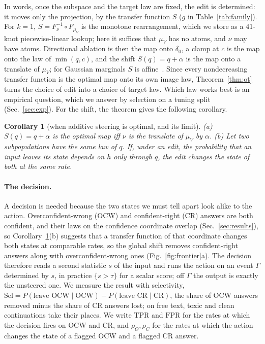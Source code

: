 \documentclass{article}
\newtheorem{corollary}{Corollary}
\newcommand{\ocw}{OCW}
\newcommand{\crok}{CR}
\begin{document}
In words, once the subspace and the target law are fixed, the edit is
determined: it moves only the projection, by the transfer function $S$ ($g$ in
Table~\ref{tab:family}). For $k=1$, $S=F_\nu^{-1}\circ F_{\mu_V}$ is the
monotone rearrangement, which we store as a 41-knot piecewise-linear lookup;
here it suffices that $\mu_V$ has no atoms, and $\nu$ may have atoms.
Directional ablation is then the map onto $\delta_0$, a clamp at $c$ is the map
onto the law of $\min(q,c)$, and the shift $S(q)=q+\alpha$ is the map onto a
translate of $\mu_V$; for Gaussian marginals $S$ is
affine~\citep{knott1984optimal,gelbrich1990formula}. Since every nondecreasing
transfer function is the optimal map onto its own image law,
Theorem~\ref{thm:ot} turns the choice of edit into a choice of target law.
Which law works best is an empirical question, which we answer by selection on
a tuning split (Sec.~\ref{sec:exp}). For the shift, the theorem gives the
following corollary.

\begin{corollary}[when additive steering is optimal, and its limit]
\label{cor:additive}
(a) $S(q)=q+\alpha$ is the optimal map iff $\nu$ is the translate of $\mu_V$
by $\alpha$.
(b) Let two subpopulations have the same law of $q$. If, under an edit, the
probability that an input leaves its state depends on $h$ only through $q$,
the edit changes the state of both at the same rate.
\end{corollary}

\paragraph{The decision.} A decision is needed because the two states we must
tell apart look alike to the action. Overconfident-wrong (\ocw{}) and
confident-right (\crok{}) answers are both confident, and their laws on the
confidence coordinate overlap (Sec.~\ref{sec:results}), so
Corollary~\ref{cor:additive}(b) suggests that a transfer function of that
coordinate changes both states at comparable rates, so the global shift
removes confident-right answers along with overconfident-wrong ones
(Fig.~\ref{fig:frontier}a). The decision therefore reads a second statistic
$s$ of the input and runs the action on an event $\Gamma$ determined by $s$, in
practice $\{s>\tau\}$ for a scalar score; off $\Gamma$ the output is exactly
the unsteered one. We measure the result with selectivity,
$\mathrm{Sel}=P(\text{leave \ocw}\mid\text{\ocw})-P(\text{leave \crok}\mid\text{\crok})$,
the share of \ocw{} answers removed minus the share of \crok{} answers lost; on
free text, toxic and clean continuations take their places. We write
$\mathrm{TPR}$ and $\mathrm{FPR}$ for the rates at which the decision fires on
\ocw{} and \crok{}, and $\rho_O,\rho_C$ for the rates at which the action
changes the state of a flagged \ocw{} and a flagged \crok{} answer.
\end{document}

